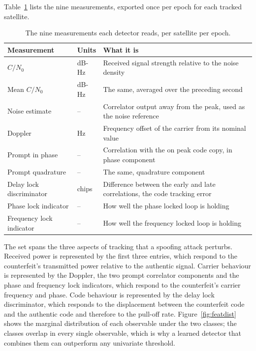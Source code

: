 Table~\ref{tab:features} lists the nine measurements, exported once per epoch for each
tracked satellite.

\begin{table}[t]
\centering
\caption{The nine measurements each detector reads, per satellite per epoch.}
\label{tab:features}
\begin{tabular}{@{}llp{5.1cm}@{}}
\toprule
Measurement & Units & What it is \\
\midrule
$C/N_0$              & dB-Hz  & Received signal strength relative to the noise density \\
Mean $C/N_0$         & dB-Hz  & The same, averaged over the preceding second \\
Noise estimate       & --     & Correlator output away from the peak, used as the noise
                                reference \\
Doppler              & Hz     & Frequency offset of the carrier from its nominal value \\
Prompt in phase      & --     & Correlation with the on peak code copy, in phase
                                component \\
Prompt quadrature    & --     & The same, quadrature component \\
Delay lock discriminator & chips & Difference between the early and late correlations,
                                the code tracking error \\
Phase lock indicator & --     & How well the phase locked loop is holding \\
Frequency lock indicator & -- & How well the frequency locked loop is holding \\
\bottomrule
\end{tabular}
\end{table}

The set spans the three aspects of tracking that a spoofing attack perturbs. Received
power is represented by the first three entries, which respond to the counterfeit's
transmitted power relative to the authentic signal. Carrier behaviour is represented by
the Doppler, the two prompt correlator components and the phase and frequency lock
indicators, which respond to the counterfeit's carrier frequency and phase. Code behaviour
is represented by the delay lock discriminator, which responds to the displacement between
the counterfeit code and the authentic code and therefore to the pull-off rate.
Figure~\ref{fig:featdist} shows the marginal distribution of each observable under the two
classes; the classes overlap in every single observable, which is why a learned detector
that combines them can outperform any univariate threshold.

